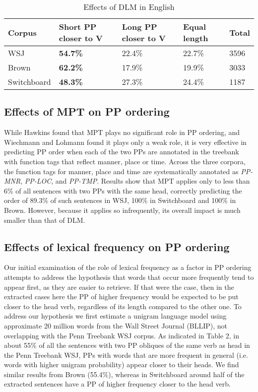 \documentclass[11pt,letterpaper]{article}
\begin{document}
\begin{table}[h!]
\small
\centering
				\begin{tabular}{|p{2cm}|p{1cm}|p{1cm}|p{1cm}|p{1cm}|}
		\hline 
		Corpus & \bf Short PP closer to V & Long PP closer to V & Equal length & Total \\ \hline
	WSJ & \bf 54.7\% & 22.4\% & 22.7\% & 3596 \\
	Brown & \bf 62.2\% & 17.9\% & 19.9\% & 3033 \\
	Switchboard & \bf 48.3\% & 27.3\% & 24.4\% & 1187 \\
	\hline
				\end{tabular}	
		\caption{Effects of DLM in English}
			\end{table}

\subsection{Effects of MPT on PP ordering}

While Hawkins  found that MPT plays no significant role in PP ordering, and Wiechmann and Lohmann  found it plays only a weak role, it is very effective in predicting PP order when each of the two PPs are annotated in the treebank with function tags that reflect manner, place or time. Across the three corpora, the function tags for manner, place and time are systematically annotated as \textit{PP-MNR}, \textit{PP-LOC}, and \textit{PP-TMP}. Results show that MPT applies only to less than 6\% of all sentences with two PPs with the same head, correctly predicting the order of 89.3\% of such sentences in WSJ, 100\% in Switchboard and 100\% in Brown. However, because it applies so infrequently, its overall impact is much smaller than that of DLM.

\subsection{Effects of lexical frequency on PP ordering}

Our initial examination of the role of lexical frequency as a factor in PP ordering attempts to address the hypothesis that words that occur more frequently tend to appear first, as they are easier to retrieve. If that were the case, then in the extracted cases here the PP of higher frequency would be expected to be put closer to the head verb, regardless of its length compared to the other one. To address our hypothesis we first estimate a unigram language model using approximate 20 million words from the Wall Street Journal (BLLIP), not overlapping with the Penn Treebank WSJ corpus. As indicated in Table 2, in about 55\% of all the sentences with two PP obliques of the same verb as head in the Penn Treebank WSJ, PPs with words that are more frequent in general (i.e. words with higher unigram probability) appear closer to their heads. We find similar results from Brown (55.4\%), whereas in Switchboard around half of the extracted sentences have a PP of higher frequency closer to the head verb. 
\end{document}
